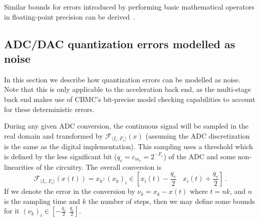Similar bounds for errors introduced by 
performing basic mathematical operators in floating-point precision can be derived~\cite{DBLP:conf/arith/BrainTRW15}.


\subsection{ADC/DAC quantization errors modelled as noise} 
In this section we describe how quantization errors can be modelled as noise. 
Note that this is only applicable to the acceleration back end, as the multi-stage back 
end makes use of CBMC's bit-precise model checking capabilities to account 
for these deterministic errors.

During any given ADC conversion, the continuous signal will be sampled in
the real domain and transformed by $\mathcal{F}_{\langle I_{c},F_{c} \rangle}
(x)$ (assuming the ADC discretization is the same as the digital
implementation).  This sampling uses a threshold which is defined by the
less significant bit ($q_{c}=c_{m_c}=2^{-F_c}$) 
of the ADC and some non-linearities of the circuitry.  The overall conversion is
%
$$\mathcal{F}_{\langle I_{c},F_{c} \rangle}(x(t)) = x_k :
(x_k)_i \in \left[x_i(t)-\frac{q_{c}}{2}\ \ \ \ x_i(t)+\frac{q_{c}}{2}\right] \,.$$
%
If we denote the error in the conversion by $\nu_k=x_k-x(t)$ where $t = nk$,
and $n$ is the sampling time and $k$ the number of steps, then we may define
some bounds for it $(\nu_k)_i \in [-\frac{q_{c}}{2}\ \ \frac{q_{c}}{2}]$.

